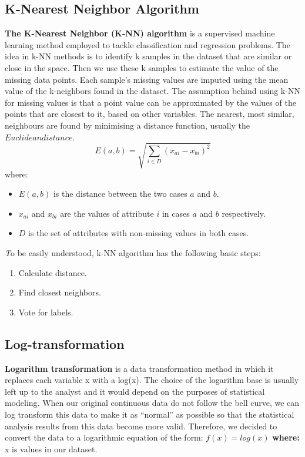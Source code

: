 \documentclass[a4paper]{article}
\theoremstyle{definition}
\begin{document}
\subsection{K-Nearest Neighbor Algorithm}
\textbf{The K-Nearest Neighbor (K-NN) algorithm} is a supervised machine learning method employed to tackle classification and regression problems. The idea in k-NN methods is to identify k samples in the dataset that are similar or close in the space. Then we use these k samples to estimate the value of the missing data points. Each sample’s missing values are imputed using the mean value of the k-neighbors found in the dataset. The assumption behind using k-NN for missing values is that a point value can be approximated by the values of the points that are closest to it, based on other variables. The nearest, most similar, neighbours are found by minimising a distance function, usually the $Euclidean distance$.
\begin{equation*}
    E(a,b) = \sqrt{\sum_{i \in D}(x_{ai} - x_{bi})^2} 
\end{equation*}
where:
\begin{itemize}
    \item $E(a, b)$ is the distance between the two cases $a$ and $b$.
    \item $x_{ai}$ and $x_{bi}$ are the values of attribute $i$ in cases $a$ and $b$ respectively.
    \item $D$ is the set of attributes with non-missing values in both cases.
\end{itemize}
\textit To be easily understood, {k}-NN algorithm has the following basic steps:
\begin{enumerate}
    \item Calculate distance.
    \item Find closest neighbors.
    \item Vote for labels.
\end{enumerate}
\subsection{Log-transformation}
\textbf{Logarithm transformation} is a data transformation method in which it replaces each variable x with a log(x). The choice of the logarithm base is usually left up to the analyst and it would depend on the purposes of statistical modeling. When our original continuous data do not follow the bell curve, we can log transform this data to make it as “normal” as possible so that the statistical analysis results from this data become more valid. Therefore, we decided to convert the data to a logarithmic equation of the form: $f(x) = log(x)$ \textbf{where:} x is values in our dataset.
\end{document}
